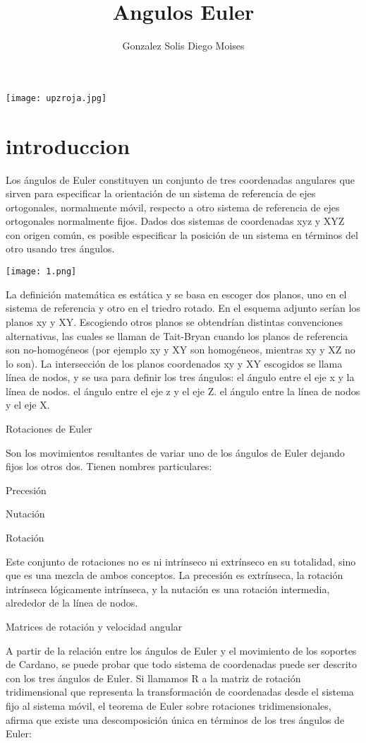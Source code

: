 \documentclass[12pt,a4paper]{article}
\author{Gonzalez Solis Diego Moises}
\title{Angulos Euler}
\begin{document}
\maketitle
\texttt{[image: upzroja.jpg]} 
\newpage
\section{introduccion}
Los ángulos de Euler constituyen un conjunto de tres coordenadas angulares que sirven para especificar la orientación de un sistema de referencia de ejes ortogonales, normalmente móvil, respecto a otro sistema de referencia de ejes ortogonales normalmente fijos.
Dados dos sistemas de coordenadas xyz y XYZ con origen común, es posible especificar la posición de un sistema en términos del otro usando tres ángulos.

\texttt{[image: 1.png]} 

La definición matemática es estática y se basa en escoger dos planos, uno en el sistema de referencia y otro en el triedro rotado. En el esquema adjunto serían los planos xy y XY. Escogiendo otros planos se obtendrían distintas convenciones alternativas, las cuales se llaman de Tait-Bryan cuando los planos de referencia son no-homogéneos (por ejemplo xy y XY son homogéneos, mientras xy y XZ no lo son).
La intersección de los planos coordenados xy y XY escogidos se llama línea de nodos, y se usa para definir los tres ángulos:
el ángulo entre el eje x y la línea de nodos.
el ángulo entre el eje z y el eje Z.
el ángulo entre la línea de nodos y el eje X.

Rotaciones de Euler

Son los movimientos resultantes de variar uno de los ángulos de Euler dejando fijos los otros dos. Tienen nombres particulares:

Precesión

Nutación

Rotación

Este conjunto de rotaciones no es ni intrínseco ni extrínseco en su totalidad, sino que es una mezcla de ambos conceptos. La precesión es extrínseca, la rotación intrínseca lógicamente intrínseca, y la nutación es una rotación intermedia, alrededor de la línea de nodos.




Matrices de rotación y velocidad angular

A partir de la relación entre los ángulos de Euler y el movimiento de los soportes de Cardano, se puede probar que todo sistema de coordenadas puede ser descrito con los tres ángulos de Euler. Si llamamos R a la matriz de rotación tridimensional que representa la transformación de coordenadas desde el sistema fijo al sistema móvil, el teorema de Euler sobre rotaciones tridimensionales, afirma que existe una descomposición única en términos de los tres ángulos de Euler:
\end{document}
